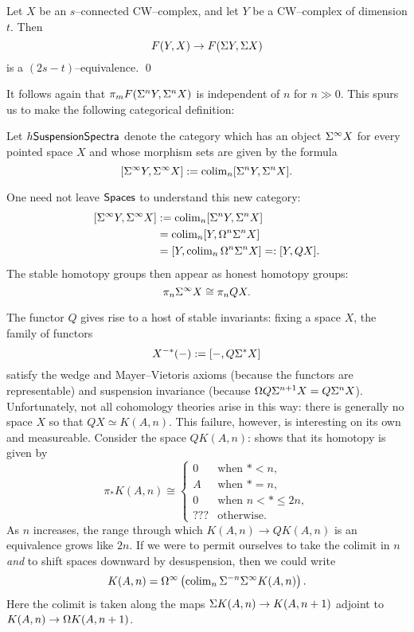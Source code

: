 \begin{corollary}
Let $X$ be an $s$--connected CW--complex, and let $Y$ be a CW--complex of dimension $t$.
Then \[F(Y, X) \to F(\Sigma Y, \Sigma X)\] is a $(2s-t)$--equivalence. \qed
\end{corollary}

\noindent It follows again that $\pi_m F(\Sigma^n Y, \Sigma^n X)$ is independent of $n$ for $n \gg 0$.
This spurs us to make the following categorical definition:

\begin{definition}
Let $h\mathsf{SuspensionSpectra}$ denote the category which has an object $\Sigma^\infty X$ for every pointed space $X$ and whose morphism sets%
are given by the formula \[[\Sigma^\infty Y, \Sigma^\infty X] := \operatorname{colim}_n [\Sigma^n Y, \Sigma^n X].\]
\end{definition}

One need not leave $\mathsf{Spaces}$ to understand this new category:
\begin{align*}
{[\Sigma^\infty Y, \Sigma^\infty X]} & := \operatorname{colim}_n [\Sigma^n Y, \Sigma^n X] \\
& = \operatorname{colim}_n [Y, \Omega^n \Sigma^n X] \\
& = [Y, \operatorname{colim}_n \Omega^n \Sigma^n X] =: [Y, QX].
\end{align*}
The stable homotopy groups then appear as honest homotopy groups: \[\pi_n \Sigma^\infty X \cong \pi_n QX.\]

The functor $Q$ gives rise to a host of stable invariants: fixing a space $X$, the family of functors \[X^{-*}(-) := [-, Q \Sigma^* X]\] satisfy the wedge and Mayer--Vietoris axioms (because the functors are representable) and suspension invariance (because $\Omega Q \Sigma^{n+1} X = Q \Sigma^n X$).
Unfortunately, not all cohomology theories arise in this way: there is generally no space $X$ so that $QX \simeq K(A, n)$.
This failure, however, is interesting on its own and measureable.
Consider the space $QK(A, n)$:  shows that its homotopy is given by \[\pi_* K(A, n) \cong \begin{cases} 0 & \text{when $* < n$}, \\ A & \text{when $* = n$}, \\ 0 & \text{when $n < * \le 2n$}, \\ ??? & \text{otherwise}. \end{cases}\]
As $n$ increases, the range through which $K(A, n) \to QK(A, n)$ is an equivalence grows like $2n$.
If we were to permit ourselves to take the colimit in $n$ \emph{and} to shift spaces downward by desuspension, then we could write \[K(A, n) = \Omega^\infty \left( \operatorname{colim}_n \Sigma^{-n} \Sigma^\infty K(A, n) \right).\]
Here the colimit is taken along the maps $\Sigma K(A, n) \to K(A, n+1)$ adjoint to $K(A, n) \to \Omega K(A, n+1)$.

